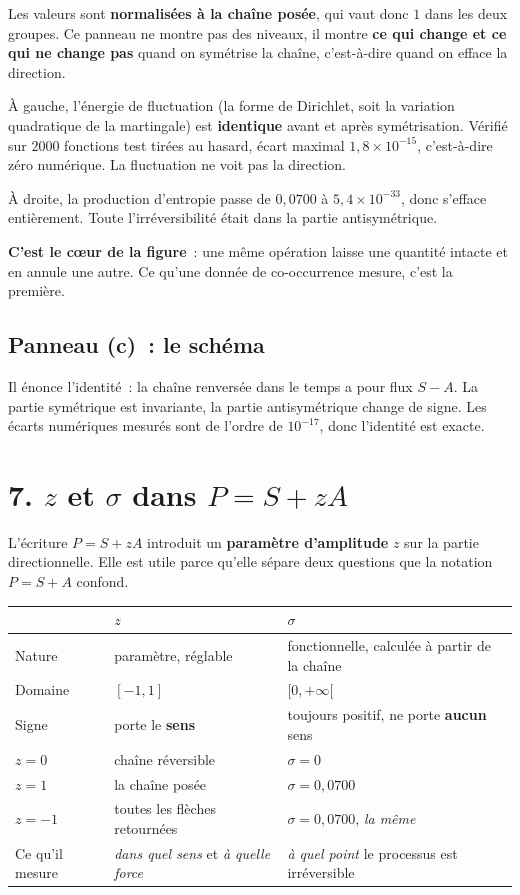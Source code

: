 \documentclass[11pt,a4paper]{article}
\begin{document}
Les valeurs sont \textbf{normalisées à la chaîne posée}, qui vaut donc $1$ dans les deux
groupes. Ce panneau ne montre pas des niveaux, il montre \textbf{ce qui change et ce qui ne
change pas} quand on symétrise la chaîne, c'est-à-dire quand on efface la direction.

À gauche, l'énergie de fluctuation (la forme de Dirichlet, soit la variation quadratique de
la martingale) est \textbf{identique} avant et après symétrisation. Vérifié sur $2000$
fonctions test tirées au hasard, écart maximal $1{,}8\times10^{-15}$, c'est-à-dire zéro
numérique. La fluctuation ne voit pas la direction.

À droite, la production d'entropie passe de $0{,}0700$ à $5{,}4\times10^{-33}$, donc
s'efface entièrement. Toute l'irréversibilité était dans la partie antisymétrique.

\textbf{C'est le c\oe{}ur de la figure}~: une même opération laisse une quantité intacte et en
annule une autre. Ce qu'une donnée de co-occurrence mesure, c'est la première.

\subsection*{Panneau (c)~: le schéma}

Il énonce l'identité~: la chaîne renversée dans le temps a pour flux $S-A$. La partie
symétrique est invariante, la partie antisymétrique change de signe. Les écarts numériques
mesurés sont de l'ordre de $10^{-17}$, donc l'identité est exacte.

\section*{7. $z$ et $\sigma$ dans $P=S+zA$}

L'écriture $P=S+zA$ introduit un \textbf{paramètre d'amplitude} $z$ sur la partie
directionnelle. Elle est utile parce qu'elle sépare deux questions que la notation
$P=S+A$ confond.

\begin{center}
\small
\begin{tabular}{@{}l p{5.2cm} p{6.6cm}@{}}
\toprule
& \textbf{$z$} & \textbf{$\sigma$} \\
\midrule
Nature & paramètre, réglable & fonctionnelle, calculée à partir de la chaîne \\
Domaine & $[-1,1]$ & $[0,+\infty[$ \\
Signe & porte le \textbf{sens} & toujours positif, ne porte \textbf{aucun} sens \\
$z=0$ & chaîne réversible & $\sigma=0$ \\
$z=1$ & la chaîne posée & $\sigma=0{,}0700$ \\
$z=-1$ & toutes les flèches retournées & $\sigma=0{,}0700$, \emph{la même} \\
Ce qu'il mesure & \emph{dans quel sens} et \emph{à quelle force} & \emph{à quel point} le
processus est irréversible \\
\bottomrule
\end{tabular}
\end{center}
\end{document}
